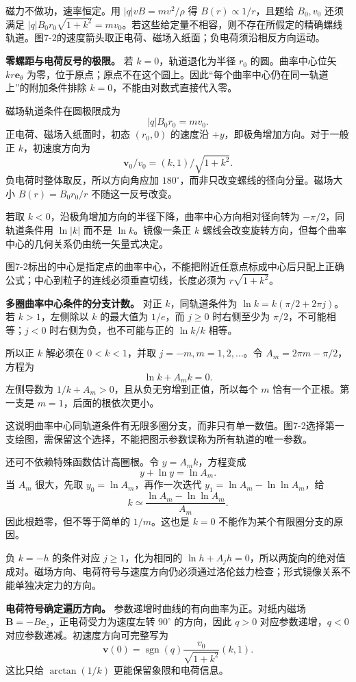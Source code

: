\documentclass[12pt,a4paper,UTF8]{ctexart}
\begin{document}
磁力不做功，速率恒定。用 \(|q|vB=mv^2/\rho\) 得
\(B(r)\propto1/r\)，且题给 \(B_0,v_0\) 还须满足
\(|q|B_0r_0\sqrt{1+k^2}=mv_0\)。若这些给定量不相容，则不存在所假定的精确螺线轨道。图7-2的速度箭头取正电荷、磁场入纸面；负电荷须沿相反方向运动。

\textbf{零螺距与电荷反号的极限。} 若 \(k=0\)，轨道退化为半径 \(r_0\)
的圆。曲率中心位矢 \(kr\bm e_\theta\)
为零，位于原点；原点不在这个圆上。因此``每个曲率中心仍在同一轨道上''的附加条件排除
\(k=0\)，不能由对数式直接代入零。

磁场轨道条件在圆极限成为 \[
|q|B_0r_0=mv_0.
\] 正电荷、磁场入纸面时，初态 \((r_0,0)\) 的速度沿
\(+y\)，即极角增加方向。对于一般正 \(k\)，初速度方向为 \[
\bm v_0/v_0=(k,1)/\sqrt{1+k^2}.
\] 负电荷时整体取反，所以方向角应加
\(180^\circ\)，而非只改变螺线的径向分量。磁场大小 \(B(r)=B_0r_0/r\)
不随这一反号改变。

若取 \(k<0\)，沿极角增加方向的半径下降，曲率中心方向相对径向转为
\(-\pi/2\)，同轨道条件用 \(\ln|k|\) 而不是 \(\ln k\)。镜像一条正 \(k\)
螺线会改变旋转方向，但每个曲率中心的几何关系仍由统一矢量式决定。

图7-2标出的中心是指定点的曲率中心，不能把附近任意点标成中心后只配上正确公式；中心到粒子的连线必须垂直切线，长度必须为
\(r\sqrt{1+k^2}\)。

\textbf{多圈曲率中心条件的分支计数。} 对正 \(k\)，同轨道条件为
\(\ln k=k(\pi/2+2\pi j)\)。若 \(k>1\)，左侧除以 \(k\) 的最大值为
\(1/e\)，而 \(j\ge0\) 时右侧至少为 \(\pi/2\)，不可能相等；\(j<0\)
时右侧为负，也不可能与正的 \(\ln k/k\) 相等。

所以正 \(k\) 解必须在 \(0<k<1\)，并取 \(j=-m,m=1,2,\ldots\)。令
\(A_m=2\pi m-\pi/2\)，方程为 \[
\ln k+A_mk=0.
\] 左侧导数为 \(1/k+A_m>0\)，且从负无穷增到正值，所以每个 \(m\)
恰有一个正根。第一支是 \(m=1\)，后面的根依次更小。

这说明曲率中心同轨道条件有无限多圈分支，而非只有单一数值。图7-2选择第一支绘图，需保留这个选择，不能把图示参数误称为所有轨道的唯一参数。

还可不依赖特殊函数估计高圈根。令 \(y=A_mk\)，方程变成 \[
y+\ln y=\ln A_m.
\] 当 \(A_m\) 很大，先取 \(y_0=\ln A_m\)，再作一次迭代
\(y_1=\ln A_m-\ln\ln A_m\)，给 \[
k\simeq\frac{\ln A_m-\ln\ln A_m}{A_m}.
\] 因此根趋零，但不等于简单的 \(1/m\)。这也是 \(k=0\)
不能作为某个有限圈分支的原因。

负 \(k=-h\) 的条件对应 \(j\ge1\)，化为相同的
\(\ln h+A_jh=0\)，所以两旋向的绝对值成对。磁场方向、电荷符号与速度方向仍必须通过洛伦兹力检查；形式镜像关系不能单独决定力的方向。

\textbf{电荷符号确定遍历方向。} 参数递增时曲线的有向曲率为正。对纸内磁场
\(\bm B=-B\bm e_z\)，正电荷受力为速度左转 \(90^\circ\) 的方向，因此
\(q>0\) 对应参数递增，\(q<0\) 对应参数递减。初速度方向可完整写为 \[
\bm v(0)=\operatorname{sgn}(q)\frac{v_0}{\sqrt{1+k^2}}(k,1).
\] 这比只给 \(\arctan(1/k)\) 更能保留象限和电荷信息。
\end{document}

